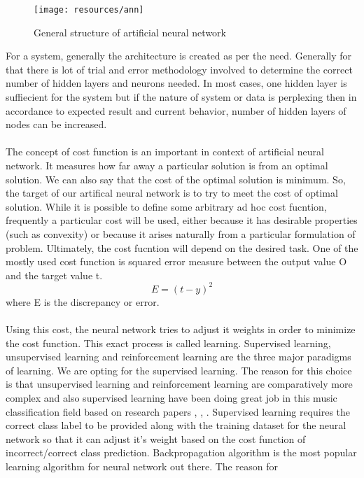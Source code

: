 \begin{figure}[h!]
        \texttt{[image: resources/ann]}
        \caption{General structure of artificial neural network}
\end{figure}
For a system, generally the architecture is created as per the need. Generally for that there is lot of trial and error methodology involved
to determine the correct number of hidden layers and neurons needed. In most cases, one hidden layer is suffiecient for the system but if 
the nature of system or data is perplexing then in accordance to expected result and current behavior, number of hidden layers of nodes can be increased.\\
\\
The concept of cost function is an important in context of artificial neural network. It measures how far away a particular solution is from an
optimal solution. We can also say that the cost of the optimal solution is minimum. So, the target of our artifical neural network is to
try to meet the cost of optimal solution. While it is possible to define some arbitrary ad hoc cost fucntion, frequently a particular cost will be used, either
because it has desirable properties (such as convexity) or because it arises naturally from a particular formulation of problem. Ultimately, the cost
fucntion will depend on the desired task. One of the mostly used cost function is squared error measure between the output value O and the target value t.
\begin{equation}
        E = (t-y)^2
\end{equation}
where E is the discrepancy or error.\\
\\
Using this cost, the neural network tries to adjust it weights in order to minimize the cost function. This exact process is called learning.
Supervised learning, unsupervised learning and reinforcement learning are the three major paradigms of learning. We are opting for the supervised learning.
The reason for this choice is that unsupervised learning and reinforcement learning are comparatively more complex and also supervised learning have been doing 
great job in this music classification field based on research papers \cite{Neumayer2004}, \cite{Haggblade2011}, \cite{Kour2015}. Supervised learning 
requires the correct class label to be provided along with the training dataset for the neural network so that it can adjust it's weight based on the cost function 
of incorrect/correct class prediction. Backpropagation algorithm is the most popular learning algorithm for neural network out there. The reason for

